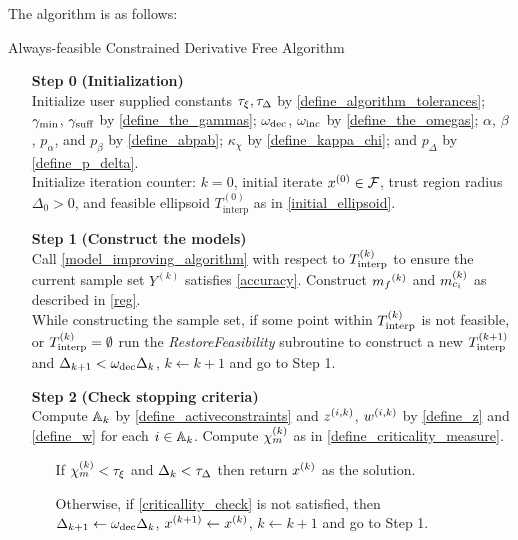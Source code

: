 The algorithm is as follows:

\begin{algorithm}[H]
    \caption{Always-feasible Constrained Derivative Free Algorithm}	
    \label{constrained_dfo}
    \begin{itemize}
        \item[\textbf{Step 0}] \textbf{(Initialization)} \\
        	Initialize user supplied constants $\tau_{\xi}, \tau_{\Delta}$ by \cref{define_algorithm_tolerances};
        	$\gamma_{\textrm{min}}$, $\gamma_{\textrm{suff}}$ by \cref{define_the_gammas};
        	$\omega_{\text{dec}}$, $\omega_{\text{inc}}$ by \cref{define_the_omegas};
        	$\alpha$, $\beta$, $p_{\alpha}$, and $p_{\beta}$ by \cref{define_abpab};
			$\kappa_{\chi}$ by \cref{define_kappa_chi};
			and $p_{\Delta}$ by \cref{define_p_delta}. \\
        	Initialize iteration counter: $k=0$, initial iterate ${x^{(0)}} \in {\mathcal F}$, trust region radius $\Delta_0 > 0$, and feasible ellipsoid $T^{(0)}_{\textrm{interp}}$ as in \cref{initial_ellipsoid}.
            
        \item[\textbf{Step 1}] \textbf{(Construct the models)} \\
        Call \cref{model_improving_algorithm} with respect to ${T_{\text{interp}}^{(k)}}$ to ensure the current sample set $Y^{(k)}$ satisfies \cref{accuracy}.
        Construct ${{m}_f}^{(k)}$ and ${{m}^{(k)}_{c_i}}$ as described in \cref{reg}. \\
        While constructing the sample set, if some point within ${T_{\text{interp}}^{(k)}}$ is not feasible, or ${T_{\text{interp}}^{(k)}} = \emptyset$ 
        run the \emph{RestoreFeasibility} subroutine to construct a new ${T_{\text{interp}}^{(k+1)}}$ and $\Delta_{k+1}<\omega_{\text{dec}} \Delta_k$, $k \gets k + 1$ and go to Step 1.
        
        \item[\textbf{Step 2}] \textbf{(Check stopping criteria)} \\
        	Compute ${\mathbb A_{k}}$ by \cref{define_activeconstraints} and ${z^{(i, k)}}$, ${w^{(i, k)}}$ by \cref{define_z} and \cref{define_w} for each $i \in {\mathbb A_{k}}$.
            Compute ${\chi_m^{(k)}}$ as in \cref{define_criticality_measure}. \begin{itemize}
                \item[] If $ {\chi_m^{(k)}} < \tau_{\xi} $ and $\Delta_k <\tau_{\Delta}$ then return $x^{(k)}$ as the solution.
                \item[] Otherwise, if \cref{criticallity_check} is not satisfied, then \\
                $\Delta_{k+1} \gets \omega_{\text{dec}}\Delta_k$, 
                $x^{(k+1)} \gets x^{(k)}$,
                $k \gets k+1$ and go to Step 1.
            \end{itemize}
		
		\end{itemize}
		\end{algorithm}
		
